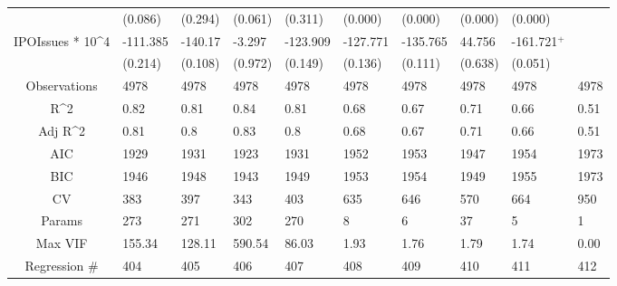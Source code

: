 \documentclass{article}
\begin{document}
\begin{table}[H]
\begin{tabular}{|clllllllll|}
   & (0.086) & (0.294) & (0.061) & (0.311) & (0.000) & (0.000) & (0.000) & (0.000) &  \\ 
  IPOIssues * 10^4 & -111.385 & -140.17 & -3.297 & -123.909 & -127.771 & -135.765 & 44.756 & -161.721$^{+}$ &  \\ 
   & (0.214) & (0.108) & (0.972) & (0.149) & (0.136) & (0.111) & (0.638) & (0.051) &  \\ 
  \hline 
 Observations & 4978 & 4978 & 4978 & 4978 & 4978 & 4978 & 4978 & 4978 & 4978 \\ 
  R^2 & 0.82 & 0.81 & 0.84 & 0.81 & 0.68 & 0.67 & 0.71 & 0.66 & 0.51 \\ 
  Adj R^2 & 0.81 & 0.8 & 0.83 & 0.8 & 0.68 & 0.67 & 0.71 & 0.66 & 0.51 \\ 
  AIC & 1929 & 1931 & 1923 & 1931 & 1952 & 1953 & 1947 & 1954 & 1973 \\ 
  BIC & 1946 & 1948 & 1943 & 1949 & 1953 & 1954 & 1949 & 1955 & 1973 \\ 
  CV & 383 & 397 & 343 & 403 & 635 & 646 & 570 & 664 & 950 \\ 
  Params & 273 & 271 & 302 & 270 & 8 & 6 & 37 & 5 & 1 \\ 
  Max VIF & 155.34 & 128.11 & 590.54 & 86.03 & 1.93 & 1.76 & 1.79 & 1.74 & 0.00 \\ 
  Regression \# & 404 & 405 & 406 & 407 & 408 & 409 & 410 & 411 & 412 \\ 
   \hline
\end{tabular}
 
\end{table}
\end{document}
